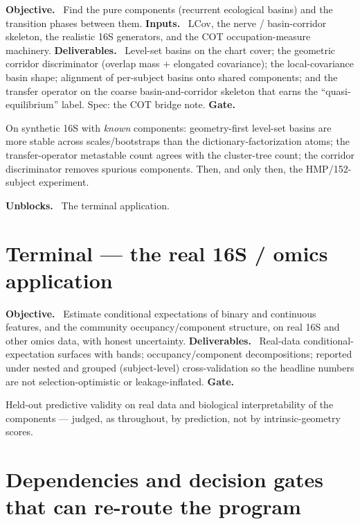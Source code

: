 \documentclass[11pt]{article}
\newcommand{\field}[1]{\smallskip\noindent\textbf{\textsf{#1.}}\ }
\begin{document}
\field{Objective} Find the pure components (recurrent ecological basins) and the
transition phases between them.
\field{Inputs} LCov, the nerve / basin-corridor skeleton, the realistic 16S
generators, and the COT occupation-measure machinery.
\field{Deliverables} Level-set basins on the chart cover; the geometric corridor
discriminator (overlap mass $+$ elongated covariance); the local-covariance basin
shape; alignment of per-subject basins onto shared components; and the transfer
operator on the coarse basin-and-corridor skeleton that earns the
``quasi-equilibrium'' label. Spec: the COT bridge note.
\field{Gate} \begin{gate} On synthetic 16S with \emph{known} components:
geometry-first level-set basins are more stable across scales/bootstraps than the
dictionary-factorization atoms; the transfer-operator metastable count agrees with
the cluster-tree count; the corridor discriminator removes spurious components. Then,
and only then, the HMP/152-subject experiment.\end{gate}
\field{Unblocks} The terminal application.

\section{Terminal --- the real 16S / omics application}\label{sec:terminal}

\field{Objective} Estimate conditional expectations of binary and continuous
features, and the community occupancy/component structure, on real 16S and other
omics data, with honest uncertainty.
\field{Deliverables} Real-data conditional-expectation surfaces with bands;
occupancy/component decompositions; reported under nested and grouped (subject-level)
cross-validation so the headline numbers are not selection-optimistic or
leakage-inflated.
\field{Gate} \begin{gate} Held-out predictive validity on real data and biological
interpretability of the components --- judged, as throughout, by prediction, not by
intrinsic-geometry scores.\end{gate}

\section{Dependencies and decision gates that can re-route the program}\label{sec:dag}
\end{document}
